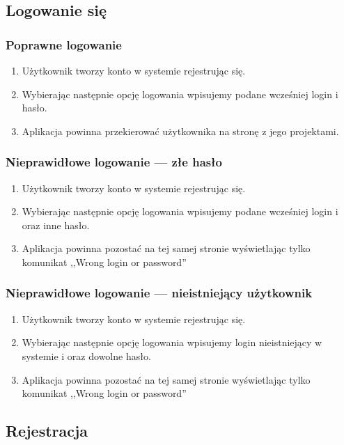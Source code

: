 \documentclass[a4paper,12pt,notitlepage]{mwrep}
\begin{document}
\subsection{Logowanie się}
\subsubsection{Poprawne logowanie}
\begin{enumerate}
	\item	Użytkownik tworzy konto w systemie rejestrując się.
	\item	Wybierając następnie opcję logowania wpisujemy podane wcześniej login i hasło.
	\item	Aplikacja powinna przekierować użytkownika na stronę z jego projektami.
\end{enumerate}

\subsubsection{Nieprawidłowe logowanie --- złe hasło}
\begin{enumerate}
	\item	Użytkownik tworzy konto w systemie rejestrując się.
	\item	Wybierając następnie opcję logowania wpisujemy podane wcześniej login i oraz inne hasło.
	\item	Aplikacja powinna pozostać na tej samej stronie wyświetlając tylko komunikat
		,,Wrong login or password''
\end{enumerate}

\subsubsection{Nieprawidłowe logowanie --- nieistniejący użytkownik}
\begin{enumerate}
	\item	Użytkownik tworzy konto w systemie rejestrując się.
	\item	Wybierając następnie opcję logowania wpisujemy login nieistniejący w systemie i oraz dowolne hasło.
	\item	Aplikacja powinna pozostać na tej samej stronie wyświetlając tylko komunikat
		,,Wrong login or password''
\end{enumerate}


\subsection{Rejestracja}
\end{document}

